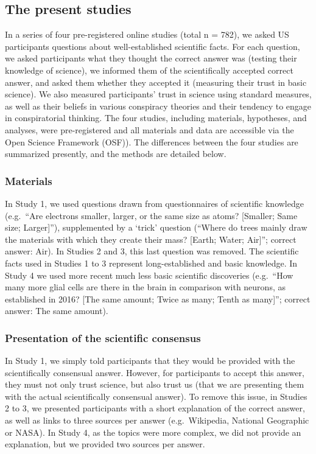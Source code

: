 \documentclass[
  doc,floatsintext]{apa6}
\begin{document}
\subsection{The present studies}\label{the-present-studies}

In a series of four pre-registered online studies (total n = 782), we asked US participants questions about well-established scientific facts. For each question, we asked participants what they thought the correct answer was (testing their knowledge of science), we informed them of the scientifically accepted correct answer, and asked them whether they accepted it (measuring their trust in basic science). We also measured participants' trust in science using standard measures, as well as their beliefs in various conspiracy theories and their tendency to engage in conspiratorial thinking. The four studies, including materials, hypotheses, and analyses, were pre-registered and all materials and data are accessible via the Open Science Framework (OSF)). The differences between the four studies are summarized presently, and the methods are detailed below.

\subsubsection{Materials}\label{materials}

In Study 1, we used questions drawn from questionnaires of scientific knowledge (e.g.~``Are electrons smaller, larger, or the same size as atoms? {[}Smaller; Same size; Larger{]}''), supplemented by a `trick' question (``Where do trees mainly draw the materials with which they create their mass? {[}Earth; Water; Air{]}''; correct answer: Air). In Studies 2 and 3, this last question was removed. The scientific facts used in Studies 1 to 3 represent long-established and basic knowledge. In Study 4 we used more recent much less basic scientific discoveries (e.g.~``How many more glial cells are there in the brain in comparison with neurons, as established in 2016? {[}The same amount; Twice as many; Tenth as many{]}''; correct answer: The same amount).

\subsubsection{Presentation of the scientific consensus}\label{presentation-of-the-scientific-consensus}

In Study 1, we simply told participants that they would be provided with the scientifically consensual answer. However, for participants to accept this answer, they must not only trust science, but also trust us (that we are presenting them with the actual scientifically consensual answer). To remove this issue, in Studies 2 to 3, we presented participants with a short explanation of the correct answer, as well as links to three sources per answer (e.g.~Wikipedia, National Geographic or NASA). In Study 4, as the topics were more complex, we did not provide an explanation, but we provided two sources per answer.
\end{document}
